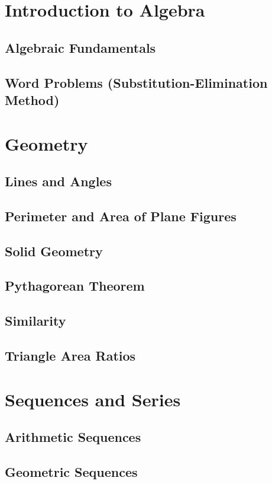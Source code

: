 \section{Introduction to Algebra}
\subsection{Algebraic Fundamentals}
\subsection{Word Problems (Substitution-Elimination Method)}

\section{Geometry}
\subsection{Lines and Angles}
\subsection{Perimeter and Area of Plane Figures}
\subsection{Solid Geometry}
\subsection{Pythagorean Theorem}
\subsection{Similarity}
\subsection{Triangle Area Ratios}

\section{Sequences and Series}
\subsection{Arithmetic Sequences}
\subsection{Geometric Sequences}

